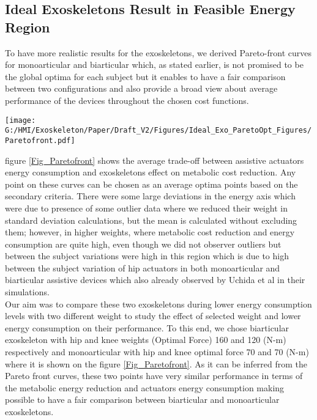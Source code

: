 \documentclass[10pt,letterpaper]{article}
\begin{document}
\subsection*{Ideal Exoskeletons Result in Feasible Energy Region}
To have more realistic results for the exoskeletons, we derived Pareto-front curves for monoarticular and biarticular which, as stated earlier, is not promised to be the global optima for each subject but it enables to have a fair comparison between two configurations and also provide a broad view about average performance of the devices throughout the chosen cost functions.
\begin{figure*}[!h]
	\centering
	\vspace{-1.\baselineskip}    
	{\texttt{[image: G:/HMI/Exoskeleton/Paper/Draft\_V2/Figures/Ideal\_Exo\_ParetoOpt\_Figures/Paretofront.pdf]}}
	\caption{Monoarticular and Biarticular hip and knee exoskeletons Pareto-front.}
	\label{Fig_Paretofront}
\end{figure*}
figure \ref{Fig_Paretofront} shows the average trade-off between assistive actuators energy consumption and exoskeletons effect on metabolic cost reduction. Any point on these curves can be chosen as an average optima points based on the secondary criteria.
There were some large deviations in the energy axis which were due to presence of some outlier data where we reduced their weight in standard deviation calculations, but the mean is calculated without excluding them; however, in higher weights, where metabolic cost reduction and energy consumption are quite high, even though we did not observer outliers but between the subject variations were high in this region which is due to high between the subject variation of hip actuators in both monoarticular and biarticular assistive devices which also already observed by Uchida et al \cite{2} in their simulations.\\
Our aim was to compare these two exoskeletons during lower energy consumption levels with two different weight to study the effect of selected weight and lower energy consumption on their performance. To this end, we chose biarticular exoskeleton with hip and knee weights (Optimal Force) 160 and 120 (N-m) respectively and monoarticular with hip and knee optimal force 70 and 70 (N-m) where it is shown on the figure \ref{Fig_Paretofront}. As it can be inferred from the Pareto front curves, these two points have very similar performance in terms of the metabolic energy reduction and actuators energy consumption making possible to have a fair comparison between biarticular and monoarticular exoskeletons.\\
\end{document}
